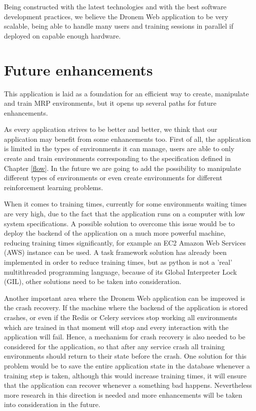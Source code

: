 \par Being constructed with the latest technologies and with the best software development practices, we believe the Dronem Web application to be very scalable, being able to handle many users and training sessions in parallel if deployed on capable enough hardware.

\section{Future enhancements}\label{futureEnh}
 This application is laid as a foundation for an efficient way to create, manipulate and train MRP environments, but it opens up several paths for future enhancements.

\par As every application strives to be better and better, we think that our application may benefit from  some enhancements too. First of all, the application is limited in the types of environments it can manage, users are able to only create and train environments corresponding to the specification defined in Chapter \ref{flow}. In the future we are going to add the possibility to manipulate different types of environments or even create environments for different reinforcement learning problems.

\par When it comes to training times, currently for some environments waiting times are very high, due to the fact that the application runs on a computer with low system specifications. A possible solution to overcome this issue would be to deploy the backend of the application on a much more powerful machine, reducing training times significantly, for example an EC2 Amazon Web Services (AWS) instance can be used. A task framework solution has already been implemented in order to reduce training times, but as python is not a 'real' multithreaded programming language, because of its Global Interpreter Lock (GIL), other solutions need to be taken into consideration.

\par Another important area where the Dronem Web application can be improved is the crash recovery. If the machine where the backend of the application is stored crashes, or even if the Redis or Celery services stop working all environments which are trained in that moment will stop and every interaction with the application will fail. Hence, a mechanism for crash recovery is also needed to be considered for the application, so that after any service crash all training environments should return to their state before the crash. One solution for this problem would be to save the entire application state in the database whenever a training step is taken, although this would increase training times, it will ensure that the application can recover whenever a something bad happens. Nevertheless more research in this direction is needed and more enhancements will be taken into consideration in the future.